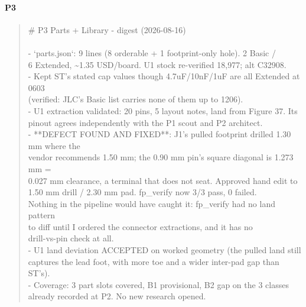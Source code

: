 \documentclass[11pt,a4paper]{article}
\begin{document}
\paragraph*{P3}
\begin{quote}\small\ttfamily\raggedright
\# P3 Parts + Library - digest (2026-08-16)\\
~\\
- `parts.json`: 9 lines (8 orderable + 1 footprint-only hole). 2 Basic /\\
  6 Extended, \textasciitilde{}1.35 USD/board. U1 stock re-verified 18,977; alt C32908.\\
- Kept ST's stated cap values though 4.7uF/10nF/1uF are all Extended at 0603\\
  (verified: JLC's Basic list carries none of them up to 1206).\\
- U1 extraction validated: 20 pins, 5 layout notes, land from Figure 37. Its\\
  pinout agrees independently with the P1 scout and P2 architect.\\
- {*}{*}DEFECT FOUND AND FIXED{*}{*}: J1's pulled footprint drilled 1.30 mm where the\\
  vendor recommends 1.50 mm; the 0.90 mm pin's square diagonal is 1.273 mm =\\
  0.027 mm clearance, a terminal that does not seat. Approved hand edit to\\
  1.50 mm drill / 2.30 mm pad. fp\_verify now 3/3 pass, 0 failed.\\
  Nothing in the pipeline would have caught it: fp\_verify had no land pattern\\
  to diff until I ordered the connector extractions, and it has no\\
  drill-vs-pin check at all.\\
- U1 land deviation ACCEPTED on worked geometry (the pulled land still\\
  captures the lead foot, with more toe and a wider inter-pad gap than ST's).\\
- Coverage: 3 part slots covered, B1 provisional, B2 gap on the 3 classes\\
  already recorded at P2. No new research opened.
\end{quote}
\end{document}
